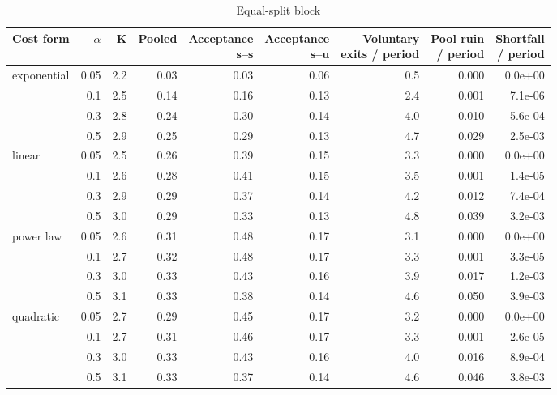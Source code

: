 \begin{table}
\centering
\caption{Equal-split block}
\label{tab:a12_equal_split}
\small
\begin{tabular}{lrrrrrrrr}
\toprule
Cost form & $\alpha$ & K & Pooled & \makecell[b]{Acceptance\\{}s--s} & \makecell[b]{Acceptance\\{}s--u} & \makecell[b]{Voluntary\\{}exits / period} & \makecell[b]{Pool ruin\\{}/ period} & \makecell[b]{Shortfall\\{}/ period} \\
\midrule
exponential & 0.05 & 2.2 & 0.03 & 0.03 & 0.06 & 0.5 & 0.000 & 0.0e+00 \\
 & 0.1 & 2.5 & 0.14 & 0.16 & 0.13 & 2.4 & 0.001 & 7.1e-06 \\
 & 0.3 & 2.8 & 0.24 & 0.30 & 0.14 & 4.0 & 0.010 & 5.6e-04 \\
 & 0.5 & 2.9 & 0.25 & 0.29 & 0.13 & 4.7 & 0.029 & 2.5e-03 \\
linear & 0.05 & 2.5 & 0.26 & 0.39 & 0.15 & 3.3 & 0.000 & 0.0e+00 \\
 & 0.1 & 2.6 & 0.28 & 0.41 & 0.15 & 3.5 & 0.001 & 1.4e-05 \\
 & 0.3 & 2.9 & 0.29 & 0.37 & 0.14 & 4.2 & 0.012 & 7.4e-04 \\
 & 0.5 & 3.0 & 0.29 & 0.33 & 0.13 & 4.8 & 0.039 & 3.2e-03 \\
power law & 0.05 & 2.6 & 0.31 & 0.48 & 0.17 & 3.1 & 0.000 & 0.0e+00 \\
 & 0.1 & 2.7 & 0.32 & 0.48 & 0.17 & 3.3 & 0.001 & 3.3e-05 \\
 & 0.3 & 3.0 & 0.33 & 0.43 & 0.16 & 3.9 & 0.017 & 1.2e-03 \\
 & 0.5 & 3.1 & 0.33 & 0.38 & 0.14 & 4.6 & 0.050 & 3.9e-03 \\
quadratic & 0.05 & 2.7 & 0.29 & 0.45 & 0.17 & 3.2 & 0.000 & 0.0e+00 \\
 & 0.1 & 2.7 & 0.31 & 0.46 & 0.17 & 3.3 & 0.001 & 2.6e-05 \\
 & 0.3 & 3.0 & 0.33 & 0.43 & 0.16 & 4.0 & 0.016 & 8.9e-04 \\
 & 0.5 & 3.1 & 0.33 & 0.37 & 0.14 & 4.6 & 0.046 & 3.8e-03 \\
\bottomrule
\end{tabular}
\end{table}
